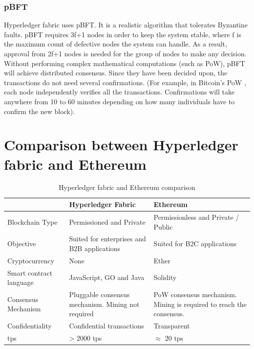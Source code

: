 \subsubsection{\ac{pBFT}}
Hyperledger fabric uses \ac{pBFT}. It is a realistic algorithm that tolerates Byzantine faults. \ac{pBFT} requires 3f+1 nodes in order to keep the system stable, where f is the maximum count of defective nodes the system can handle. As a result, approval from 2f+1 nodes is needed for the group of nodes to make any decision. Without performing complex mathematical computations (such as \ac{PoW}), \ac{pBFT} will achieve distributed consensus. Since they have been decided upon, the transactions do not need several confirmations. (For example, in Bitcoin's PoW , each node independently verifies all the transactions. Confirmations will take anywhere from 10 to 60 minutes depending on how many individuals have to confirm the new block).

\pagebreak

\section{Comparison between Hyperledger fabric and Ethereum}
\begin{table}[htbp]
\begin{center}

\begin{tabular}{ | m{3cm} | m{4.5cm}| m{4.5cm} | } 
\hline
& Hyperledger Fabric & Ethereum \\ 
\hline
Blockchain Type & Permissioned and Private & Permissionless and Private / Public\\ 
\hline
Objective & Suited for enterprises and B2B applications & Suited for B2C applications \\ 
\hline
Cryptocurrency & None & Ether \\ 
\hline
Smart contract language & JavaScript, GO and Java & Solidity \\ 
\hline
Consensus Mechanism & Pluggable consensus mechanism. Mining not required & \ac{PoW} consensus mechanism. Mining is required to reach the consensus.\\ 
\hline
Confidentiality & Confidential transactions & Transparent \\ 
\hline
\ac{tps} & > 2000 \ac{tps}  & $\approx$ 20 \ac{tps}  \\ 
\hline
\end{tabular}
\caption{Hyperledger fabric and Ethereum comparison}
\label{table:1}
    
\end{center}
\end{table}
